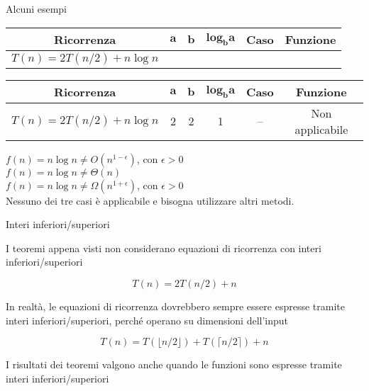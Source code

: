 \begin{frame}[shrink=6]{Alcuni esempi}

\bgroup
\def\arraystretch{1.1}

\begin{overprint}


\begin{tabular}{|c|c|c|c|c|c|}
\hline
\textbf{Ricorrenza} & $\mathbf{a}$ & $\mathbf{b}$ & $\mathbf{\textbf{log}_b a}$ & \textbf{Caso} & \textbf{Funzione} \\
\hline
$T(n) = 2T(n/2)+n \log n$ &  &  &  &  &  \\
\hline
\end{tabular}


\begin{tabular}{|c|c|c|c|c|c|}
\hline
\textbf{Ricorrenza} & $\mathbf{a}$ & $\mathbf{b}$ & $\mathbf{\textbf{log}_b a}$ & \textbf{Caso} & \textbf{Funzione} \\
\hline
$T(n) = 2T(n/2)+n \log n$ & 2 & 2 & 1 & -- & Non applicabile \\
\hline
\end{tabular}

\end{overprint}

\egroup

\begin{mybox}
$f(n) = n \log n \neq O(n^{1-\epsilon})$, con $\epsilon>0$\\[3pt]
$f(n) = n \log n \neq \Theta(n)$\\[3pt]
$f(n) = n \log n \neq \Omega(n^{1+\epsilon})$, con $\epsilon>0$\\[3pt]
   
Nessuno dei tre casi è applicabile e bisogna utilizzare altri metodi.
\end{mybox}

\end{frame}

\begin{frame}{Interi inferiori/superiori}

\BIL
\item I teoremi appena visti non considerano equazioni di ricorrenza con interi inferiori/superiori

\[
T(n) = 2T(n/2) + n
\]

\item In realtà, le equazioni di ricorrenza dovrebbero sempre essere espresse tramite interi inferiori/superiori, perché operano su dimensioni dell'input

\[
T(n) = T(\lfloor n/2 \rfloor) + T(\lceil n/2 \rceil) + n
\]

\item I risultati dei teoremi valgono anche quando le funzioni sono espresse tramite interi inferiori/superiori

\EIL
	
\end{frame}

